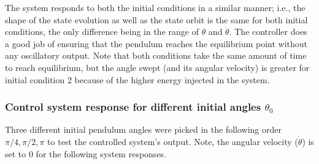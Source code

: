 \documentclass[10pt]{article}
\begin{document}
The system responds to both the initial conditions in a similar manner; i.e., the shape of the state evolution as well as the state orbit is the same for both initial conditions, the only difference being in the range of $\theta$ and $\dot{\theta}$. The controller does a good job of ensuring that the pendulum reaches the equilibrium point without any oscillatory output. Note that both conditions take the same amount of time to reach equilibrium, but the angle swept (and its angular velocity) is greater for initial condition 2 because of the higher energy injected in the system. 

\subsubsection{Control system response for different initial angles \texorpdfstring{$\theta_0$}{}}
Three different initial pendulum angles were picked in the following order $\pi/4, \pi/2, \pi$ to test the controlled system's output. Note, the angular velocity ($\dot{\theta}$) is set to 0 for the following system responses.
\end{document}
